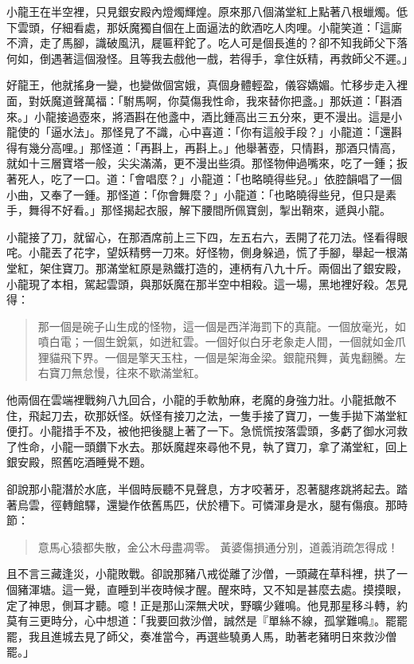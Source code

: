 小龍王在半空裡，只見銀安殿內燈燭輝煌。原來那八個滿堂紅上點著八根蠟燭。低下雲頭，仔細看處，那妖魔獨自個在上面逼法的飲酒吃人肉哩。小龍笑道：「這廝不濟，走了馬腳，識破風汛，屣匾秤鉈了。吃人可是個長進的？卻不知我師父下落何如，倒遇著這個潑怪。且等我去戲他一戲，若得手，拿住妖精，再救師父不遲。」

好龍王，他就搖身一變，也變做個宮娥，真個身體輕盈，儀容嬌媚。忙移步走入裡面，對妖魔道聲萬福：「駙馬啊，你莫傷我性命，我來替你把盞。」那妖道：「斟酒來。」小龍接過壺來，將酒斟在他盞中，酒比鍾高出三五分來，更不漫出。這是小龍使的「逼水法」。那怪見了不識，心中喜道：「你有這般手段？」小龍道：「還斟得有幾分高哩。」那怪道：「再斟上，再斟上。」他舉著壺，只情斟，那酒只情高，就如十三層寶塔一般，尖尖滿滿，更不漫出些須。那怪物伸過嘴來，吃了一鍾；扳著死人，吃了一口。道：「會唱麼？」小龍道：「也略曉得些兒。」依腔韻唱了一個小曲，又奉了一鍾。那怪道：「你會舞麼？」小龍道：「也略曉得些兒，但只是素手，舞得不好看。」那怪揭起衣服，解下腰間所佩寶劍，掣出鞘來，遞與小龍。

小龍接了刀，就留心，在那酒席前上三下四，左五右六，丟開了花刀法。怪看得眼咤。小龍丟了花字，望妖精劈一刀來。好怪物，側身躲過，慌了手腳，舉起一根滿堂紅，架住寶刀。那滿堂紅原是熟鐵打造的，連柄有八九十斤。兩個出了銀安殿，小龍現了本相，駕起雲頭，與那妖魔在那半空中相殺。這一場，黑地裡好殺。怎見得：
\begin{quote}
那一個是碗子山生成的怪物，這一個是西洋海罰下的真龍。一個放毫光，如噴白電；一個生銳氣，如迸紅雲。一個好似白牙老象走人間，一個就如金爪狸貓飛下界。一個是擎天玉柱，一個是架海金梁。銀龍飛舞，黃鬼翻騰。左右寶刀無怠慢，往來不歇滿堂紅。
\end{quote}

他兩個在雲端裡戰夠八九回合，小龍的手軟觔麻，老魔的身強力壯。小龍抵敵不住，飛起刀去，砍那妖怪。妖怪有接刀之法，一隻手接了寶刀，一隻手拋下滿堂紅便打。小龍措手不及，被他把後腿上著了一下。急慌慌按落雲頭，多虧了御水河救了性命，小龍一頭鑽下水去。那妖魔趕來尋他不見，執了寶刀，拿了滿堂紅，回上銀安殿，照舊吃酒睡覺不題。

卻說那小龍潛於水底，半個時辰聽不見聲息，方才咬著牙，忍著腿疼跳將起去。踏著烏雲，徑轉館驛，還變作依舊馬匹，伏於槽下。可憐渾身是水，腿有傷痕。那時節：
\begin{quote}
意馬心猿都失散，金公木母盡凋零。
黃婆傷損通分別，道義消疏怎得成！
\end{quote}

且不言三藏逢災，小龍敗戰。卻說那豬八戒從離了沙僧，一頭藏在草科裡，拱了一個豬渾塘。這一覺，直睡到半夜時候才醒。醒來時，又不知是甚麼去處。摸摸眼，定了神思，側耳才聽。噫！正是那山深無犬吠，野曠少雞鳴。他見那星移斗轉，約莫有三更時分，心中想道：「我要回救沙僧，誠然是『單絲不線，孤掌難鳴』。罷罷罷，我且進城去見了師父，奏准當今，再選些驍勇人馬，助著老豬明日來救沙僧罷。」

